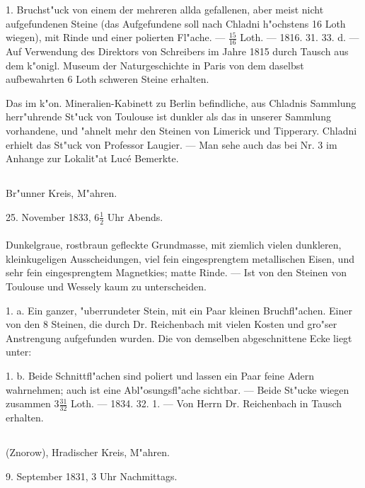 \documentclass[a4paper, 11pt, oneside, polutonikogreek, german]{article}
\begin{document}
1. Bruchst"uck von einem der mehreren allda gefallenen, aber meist nicht aufgefundenen Steine (das Aufgefundene soll nach Chladni h"ochstens 16 Loth wiegen), mit Rinde und einer polierten Fl"ache. --- $\mathfrak{\frac{15}{16}}$ Loth. --- 1816. 31. 33. d. --- Auf Verwendung des Direktors von Schreibers im Jahre 1815 durch Tausch aus dem k"onigl. Museum der Naturgeschichte in Paris von dem daselbst aufbewahrten 6 Loth schweren Steine erhalten.

\setlength{\leftskip}{10mm}
\setlength{\parindent}{0pt}

{\footnotesize Das im k"on. Mineralien-Kabinett zu Berlin befindliche, aus Chladnis Sammlung herr"uhrende St"uck von Toulouse ist dunkler als das in unserer Sammlung vorhandene, und "ahnelt mehr den Steinen von Limerick und Tipperary. Chladni erhielt das St"uck von Professor Laugier. --- Man sehe auch das bei Nr. 3 im Anhange zur Lokalit"at Lucé Bemerkte.}

\setlength{\leftskip}{0pt}
\setlength{\parindent}{20pt}

\subsection{}
\begin{center}

Br"unner Kreis, M"ahren.

25. November 1833, $\mathfrak{6\frac{1}{2}}$ Uhr Abends.
\end{center}
\paragraph{}
Dunkelgraue, rostbraun gefleckte Grundmasse, mit ziemlich vielen dunkleren, kleinkugeligen Ausscheidungen, viel fein eingesprengtem metallischen Eisen, und sehr fein eingesprengtem Magnetkies; matte Rinde. --- Ist von den Steinen von Toulouse und Wessely kaum zu unterscheiden.

1. a. Ein ganzer, "uberrundeter Stein, mit ein Paar kleinen Bruchfl"achen. Einer von den 8 Steinen, die durch Dr. Reichenbach mit vielen Kosten und gro"ser Anstrengung aufgefunden wurden. Die von demselben abgeschnittene Ecke liegt unter:

1. b. Beide Schnittfl"achen sind poliert und lassen ein Paar feine Adern wahrnehmen; auch ist eine Abl"osungsfl"ache sichtbar. --- Beide St"ucke wiegen zusammen $\mathfrak{3\frac{31}{32}}$ Loth. --- 1834. 32. 1. --- Von Herrn Dr. Reichenbach in Tausch erhalten.
\subsection{}
\begin{center}

(Znorow), Hradischer Kreis, M"ahren.

9. September 1831, 3 Uhr Nachmittags.
\end{center}
\end{document}
